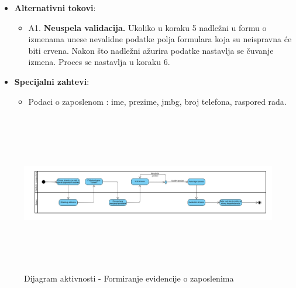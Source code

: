 \begin{itemize}
  \item \textbf{Alternativni tokovi}:
      \begin{itemize}
        \item A1. \textbf{Neuspela validacija.}
        Ukoliko u koraku 5 nadležni u formu o izmenama unese nevalidne podatke polja formulara koja su neispravna će biti crvena.
        Nakon što nadležni ažurira podatke nastavlja se čuvanje izmena. Proces se nastavlja u koraku 6.
      \end{itemize}

      
  \item \textbf{Specijalni zahtevi}:
      \begin{itemize}
        \item Podaci o zaposlenom : ime, prezime, jmbg, broj telefona, raspored rada.
      \end{itemize}
\end{itemize}

\begin{figure}[H]
  \begin{center}
      \includegraphics[width=140mm, height=70mm]{Diagrams/evidencija_zaposlenih.png}
  \end{center}
  \caption {Dijagram aktivnosti - Formiranje evidencije o zaposlenima}
  \label{activity_evidencija_zaposlenih}

\end{figure}
